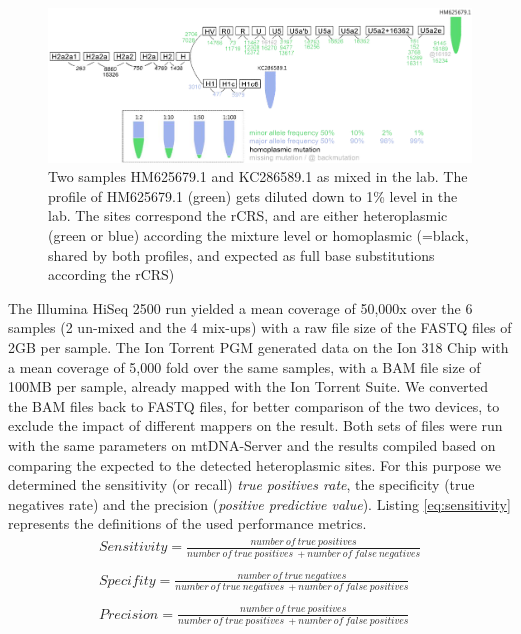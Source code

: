 \begin{figure}[!ht]
    \centering
    \includegraphics[width=1\textwidth]{images/mix-ups.png}
    \caption[Sample mixtures in the lab]{Two samples HM625679.1 and KC286589.1 as mixed in the lab. The profile of HM625679.1 (green) gets diluted down to 1\% level in the lab. The sites correspond the rCRS, and are either heteroplasmic (green or blue) according the mixture level or homoplasmic (=black, shared by both profiles, and expected as full base substitutions according the rCRS)} 
    \label{fig:mtdna-mix-ups}
\end{figure}
The Illumina HiSeq 2500 run yielded a mean coverage of 50,000x over the 6 samples (2 un-mixed and the 4 mix-ups) with a raw file size of the FASTQ files of 2GB per sample. The Ion Torrent PGM generated data on the Ion 318 Chip with a mean coverage of 5,000 fold over the same samples, with a BAM file size of 100MB per sample, already mapped with the Ion Torrent Suite. We converted the BAM files back to FASTQ files, for better comparison of the two devices, to exclude the impact of different mappers on the result. Both sets of files were run with the same parameters on mtDNA-Server and the results compiled based on comparing the expected to the detected heteroplasmic sites. For this purpose we determined the sensitivity (or recall) \textit{true positives rate}, the specificity (true negatives rate) and the precision (\textit{positive predictive value}). Listing \ref{eq:sensitivity} represents the definitions of the used performance metrics. 
\begin{equation}\label{eq:sensitivity}
\begin{split}
  Sensitivity =  \frac{number\ of\ true\ positives}{number\ of\ true\ positives\ + number\ of\ false\ negatives}\\ \\
  Specifity =  \frac{number\ of\ true\ negatives}{number\ of\ true\ negatives\ + number\ of\ false\ positives}\\  \\
  Precision = \frac{number\ of\ true\ positives}{number\ of\ true\ positives\ + number\ of\ false\ positives}
\end{split}
\end{equation}
